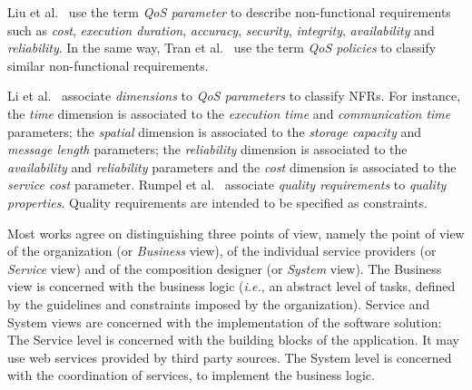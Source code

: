Liu et al.~\cite{Liu20121080} use the term \textit{QoS parameter} to describe non-functional requirements such as \textit{cost}, \textit{execution duration}, \textit{accuracy}, \textit{security}, \textit{integrity}, \textit{availability} and \textit{reliability}.  
In the same way, Tran et al.~\cite{Tran2012531} use the term \textit{QoS policies} to classify similar non-functional requirements.

Li et al.~\cite{Li2013} associate \textit{dimensions} to  \textit{QoS parameters} to classify NFRs.  
For instance, the \textit{time} dimension is associated to the \textit{execution time} and \textit{communication time} parameters; the \textit{spatial} dimension is associated to the \textit{storage capacity} and \textit{message length} parameters; the \textit{reliability} dimension is associated to the \textit{availability} and \textit{reliability} parameters and the \textit{cost} dimension is associated to the \textit{service cost} parameter.
Rumpel et al.~\cite{Rumpel2012}  associate \textit{quality requirements} to  \textit{quality properties}. Quality requirements are intended to be specified as constraints. 

\bigskip
Most works agree on distinguishing three points of view, namely the point of view of the organization (or \textit{Business} view), of the individual service providers (or \textit{Service} view) and of the composition designer (or \textit{System} view).
The Business view is concerned with the business logic (\textit{i.e.}, an abstract level of tasks, defined by the guidelines and constraints imposed by the organization).
Service and System views are concerned with the implementation of the software solution: The Service level is concerned with the building blocks of the application.
It may use web services provided by third party sources.
The System level is concerned with the coordination of services, to implement the business logic.
